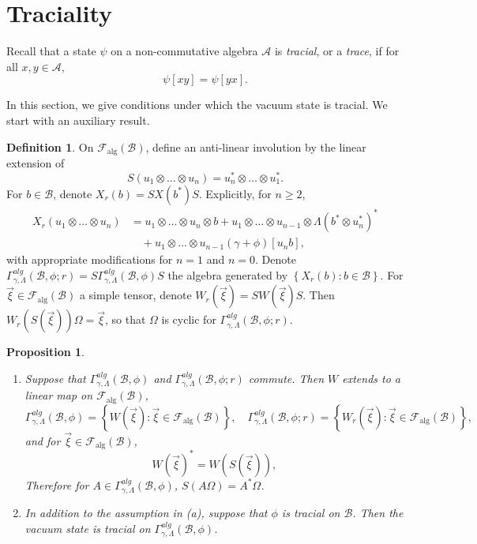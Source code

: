 \documentclass[12pt]{amsart}
\newtheorem{Prop}[Thm]{Proposition}
\theoremstyle{definition}
\newtheorem{Defn}[Thm]{Definition}
\newcommand{\set}[1]{\left\{#1\right\}}
\newcommand{\mc}[1]{\mathcal{#1}}
\begin{document}
\section{Traciality}
\label{Section:Trace}

Recall that a state $\psi$ on a non-commutative algebra $\mc{A}$ is \textit{tracial}, or a \textit{trace}, if for all $x,y\in\mc{A}$,
\begin{equation*}
\psi[xy] = \psi[yx].
\end{equation*}

In this section, we give conditions under which the vacuum state is tracial. We start with an auxiliary result.

\begin{Defn}
On $\mc{F}_{\text{alg}}(\mc{B})$, define an anti-linear involution by the linear extension of
\[
S(u_1 \otimes \ldots \otimes u_n) = u_n^\ast \otimes \ldots \otimes u_1^\ast.
\]
For $b \in \mc{B}$, denote $X_r(b) = S X(b^\ast) S$. Explicitly, for $n \geq 2$,
\[
\begin{split}
X_r(u_1 \otimes \ldots \otimes u_n)
& = u_1 \otimes \ldots \otimes u_n \otimes b + u_1 \otimes \ldots \otimes u_{n-1} \otimes \Lambda(b^\ast \otimes u_n^\ast)^\ast \\
&\quad + u_1 \otimes \ldots \otimes u_{n-1} (\gamma + \phi)[u_n b],
\end{split}
\]
with appropriate modifications for $n = 1$ and $n=0$. Denote $\Gamma^{alg}_{\gamma, \Lambda}(\mc{B}, \phi; r) = S \Gamma^{alg}_{\gamma, \Lambda}(\mc{B}, \phi) S$ the algebra generated by $\set{X_r(b) : b \in \mc{B}}$. For $\vec{\xi} \in \mc{F}_{\text{alg}}(\mc{B})$ a simple tensor, denote $W_r(\vec{\xi}) = S W(\vec{\xi}) S$. Then $W_r(S(\vec{\xi})) \Omega = \vec{\xi}$, so that $\Omega$ is cyclic for $\Gamma^{alg}_{\gamma, \Lambda}(\mc{B}, \phi; r)$.
\end{Defn}


\begin{Prop}
\label{Prop:Interacting-traciality}
\

\begin{enumerate}
\item
Suppose that $\Gamma^{alg}_{\gamma, \Lambda}(\mc{B}, \phi)$ and $\Gamma^{alg}_{\gamma, \Lambda}(\mc{B}, \phi; r)$ commute. Then $W$ extends to a linear map on $\mc{F}_{\text{alg}}(\mc{B})$,
\[
\Gamma^{alg}_{\gamma, \Lambda}(\mc{B}, \phi) = \set{W(\vec{\xi}) : \vec{\xi} \in \mc{F}_{\text{alg}}(\mc{B})}, \quad \Gamma^{alg}_{\gamma, \Lambda}(\mc{B}, \phi; r) = \set{W_r(\vec{\xi}) : \vec{\xi} \in \mc{F}_{\text{alg}}(\mc{B})},
\]
and for $\vec{\xi} \in \mc{F}_{\text{alg}}(\mc{B})$,
\[
W(\vec{\xi})^\ast = W(S(\vec{\xi})),
\]
Therefore for $A \in \Gamma^{alg}_{\gamma, \Lambda}(\mc{B}, \phi)$, $S(A \Omega) = A^\ast \Omega$.
\item
In addition to the assumption in (a), suppose that $\phi$ is tracial on $\mc{B}$. Then the vacuum state is tracial on $\Gamma^{alg}_{\gamma, \Lambda}(\mc{B}, \phi)$.
\end{enumerate}
\end{Prop}
\end{document}
